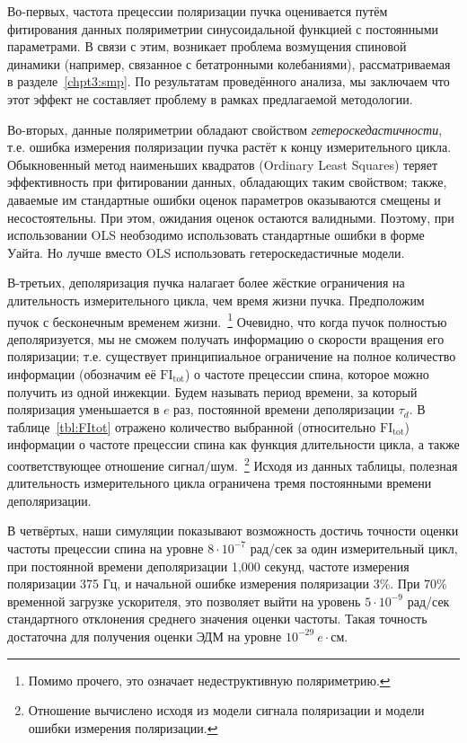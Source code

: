 Во-первых, частота прецессии поляризации пучка оценивается путём фитирования данных поляриметрии синусоидальной функцией с постоянными параметрами. В связи с этим, возникает проблема возмущения спиновой динамики (например, связанное с бетатронными колебаниями), рассматриваемая в разделе~\ref{chpt3:smp}. По результатам проведённого анализа, мы заключаем что этот эффект не составляет проблему в рамках предлагаемой методологии.

Во-вторых, данные поляриметрии обладают свойством \emph{гетероскедастичности},  т.е. ошибка измерения поляризации пучка растёт к концу измерительного цикла.~\cite{Eversmann:Thesis} Обыкновенный метод наименьших квадратов (Ordinary Least Squares) теряет эффективность при фитировании данных, обладающих таким свойством; также, даваемые им стандартные ошибки оценок параметров оказываются смещены и несостоятельны. При этом, ожидания оценок остаются валидными. Поэтому, при использовании OLS необзодимо использовать стандартные ошибки в форме Уайта. Но лучше вместо OLS использовать гетероскедастичные модели.~\cite{Stats:R:NLREG, Stats:HeteroskedasticNRM}

В-третьих, деполяризация пучка налагает более жёсткие ограничения на длительность измерительного цикла, чем время жизни пучка. Предположим пучок с бесконечным временем жизни.~\footnote{Помимо прочего, это означает недеструктивную поляриметрию.} Очевидно, что когда пучок полностью деполяризуется, мы не сможем получать информацию о скорости вращения его поляризации; т.е. существует принципиальное ограничение на полное количество информации (обозначим её $\mathrm{FI_{tot}}$) о частоте прецессии спина, которое можно получить из одной инжекции. Будем называть период времени, за который поляризация уменьшается в $e$ раз, постоянной времени деполяризации $\tau_d$. В таблице~\ref{tbl:FItot} отражено количество выбранной (относительно $\mathrm{FI_{tot}}$) информации о частоте прецессии спина как функция длительности цикла, а также соответствующее отношение сигнал/шум.~\footnote{Отношение вычислено исходя из модели сигнала поляризации и модели ошибки измерения поляризации.} Исходя из данных таблицы, полезная длительность измерительного цикла ограничена тремя постоянными времени деполяризации.

В четвёртых, наши симуляции показывают возможность достичь точности оценки частоты прецессии спина на уровне $8\cdot 10^{-7}$ рад/сек за один измерительный цикл, при постоянной времени деполяризации 1,000 секунд, частоте измерения поляризации 375 Гц, и начальной ошибке измерения поляризации 3\%. При 70\%  временной загрузке ускорителя, это позволяет выйти на уровень $5\cdot 10^{-9}$ рад/сек стандартного отклонения среднего значения оценки частоты. Такая точность достаточна для получения оценки ЭДМ на уровне $10^{-29}~e\cdot$см.

